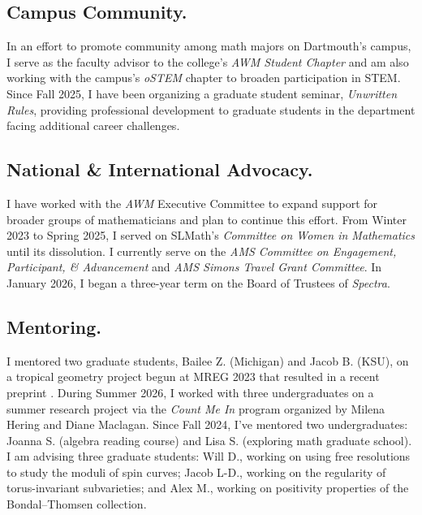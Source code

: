 \documentclass[11pt,reqno]{amsart}
\theoremstyle{remark}
\begin{document}
\subsection{Campus Community.} In an effort to promote community among math majors on Dartmouth's campus, I serve as the faculty advisor to the college's \textit{AWM Student Chapter} and am also working with the campus's \textit{oSTEM} chapter to broaden participation in STEM. Since Fall 2025, I have been organizing a graduate student seminar, \textit{Unwritten Rules}, providing professional development to graduate students in the department facing additional career challenges.

\subsection{ National \& International Advocacy.} I have worked with the \textit{AWM} Executive Committee to expand support for broader groups of mathematicians and plan to continue this effort. From Winter 2023 to Spring 2025, I served on SLMath's \textit{Committee on Women in Mathematics} until its dissolution. I currently serve on the \textit{AMS Committee on Engagement, Participant, \& Advancement} and \textit{AMS Simons Travel Grant Committee}. In January 2026, I began a three-year term on the Board of Trustees of \textit{Spectra}.

\subsection{Mentoring.} I mentored two graduate students, Bailee Z. (Michigan) and Jacob B. (KSU), on a tropical geometry project begun at MREG 2023 that resulted in a recent preprint \cite{BBZ26}. During Summer 2026, I worked with three undergraduates on a summer research project via the \textit{Count Me In} program organized by Milena Hering and Diane Maclagan. Since Fall 2024, I’ve mentored two undergraduates: Joanna S. (algebra reading course) and Lisa S. (exploring math graduate school). I am advising three graduate students: Will D., working on using free resolutions to study the moduli of spin curves; Jacob L-D., working on the regularity of torus-invariant subvarieties; and Alex M., working on positivity properties of the Bondal--Thomsen collection. 


\newpage
\renewcommand{\bibliofont}{\normalsize}



\end{document}
